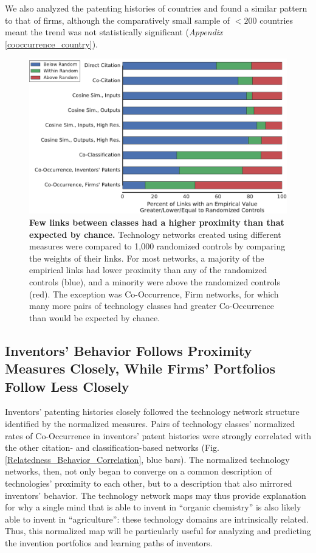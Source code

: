 \documentclass[]{svjour3}
\begin{document}
We also analyzed the patenting histories of countries and found a similar pattern to that of firms, although the comparatively small sample of $<200$ countries meant the trend was not statistically significant (\textit{Appendix} \ref{cooccurrence_country}). 

\begin{figure}[h]
\begin{center}
\includegraphics[width=.75\textwidth]{figs/Related_Unrelated_Percentages_Two_Column_IPC.pdf} 
\end{center}
\caption{\textbf{Few links between classes had a higher proximity than that expected by chance.} Technology networks created using different measures were compared to 1,000 randomized controls by comparing the weights of their links. For most networks, a majority of the empirical links had lower proximity than any of the randomized controls (blue), and a minority were above the randomized controls (red). The exception was Co-Occurrence, Firm networks, for which many more pairs of technology classes had greater Co-Occurrence than would be expected by chance.
}\label{related_unrelated_percentages}
\end{figure}

\subsection{Inventors' Behavior Follows Proximity Measures Closely, While Firms' Portfolios Follow Less Closely}
Inventors' patenting histories closely followed the technology network structure identified by the normalized measures. Pairs of technology classes' normalized rates of Co-Occurrence in inventors' patent histories were strongly correlated with the other citation- and classification-based networks (Fig. \ref{Relatedness_Behavior_Correlation}, blue bars). The normalized technology networks, then, not only began to converge on a common description of technologies' proximity to each other, but to a description that also mirrored inventors' behavior. The technology network maps may thus provide explanation for why a single mind that is able to invent in ``organic chemistry'' is also likely able to invent in ``agriculture'': these technology domains are intrinsically related. Thus, this normalized map will be particularly useful for analyzing and predicting the invention portfolios and learning paths of inventors.
\end{document}
